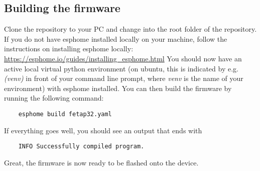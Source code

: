\documentclass[]{article}
\begin{document}
\subsection{Building the firmware}
Clone the repository to your PC and change into the root folder of the repository.
\newline
\newline
If you do not have esphome installed locally on your machine, follow the instructions on installing esphome locally: \href{https://esphome.io/guides/installing_esphome.html}{https://esphome.io/guides/installing\_esphome.html}
\newline
\newline
You should now have an active local virtual python environment (on ubuntu, this is indicated by e.g. \textit{(venv)} in front of your command line prompt, where \textit{venv} is the name of your environment) with esphome installed. You can then build the firmware by running the following command:
\begin{verbatim}
	esphome build fetap32.yaml
\end{verbatim}
If everything goes well, you should see an output that ends with
\begin{verbatim}
	INFO Successfully compiled program.
\end{verbatim}
Great, the firmware is now ready to be flashed onto the device.
\end{document}
